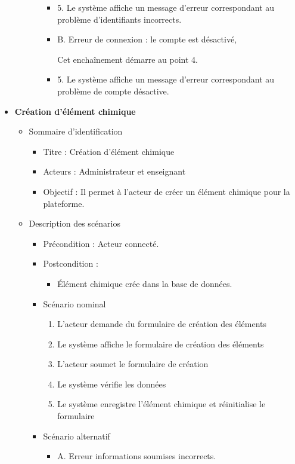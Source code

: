\begin{itemize}
\begin{itemize}
\begin{itemize}
\begin{itemize}
				                  \item 5. Le système affiche un message d’erreur correspondant au problème d’identifiants incorrects.
				                  \item B. Erreur de connexion : le compte est désactivé,

				                        Cet enchaînement démarre au point 4.

				                  \item 5. Le système affiche un message d’erreur correspondant au problème de compte désactive.
			                  \end{itemize}
		            \end{itemize}
	      \end{itemize}
	\item \textbf{Création d’élément chimique }
	      \begin{itemize}
		      \item Sommaire d’identification
		            \begin{itemize}
			            \item Titre : Création d’élément chimique
			            \item Acteurs : Administrateur et enseignant
			            \item Objectif : Il permet à l’acteur de créer un élément chimique pour la plateforme.
		            \end{itemize}
		      \item Description des scénarios
		            \begin{itemize}
			            \item Précondition : Acteur connecté.
			            \item Postcondition :
			                  \begin{itemize}
				                  \item Élément chimique crée dans la base de données.
			                  \end{itemize}
			            \item Scénario nominal
			                  \begin{enumerate}
				                  \item L’acteur demande du formulaire de création des éléments
				                  \item Le système affiche le formulaire de création des éléments
				                  \item L’acteur soumet le formulaire de création
				                  \item Le système vérifie les données
				                  \item Le système enregistre l’élément chimique et réinitialise le formulaire
			                  \end{enumerate}
			            \item Scénario alternatif
			                  \begin{itemize}
				                  \item A. Erreur informations soumises incorrects.


\end{itemize}
\end{itemize}
\end{itemize}
\end{itemize}
